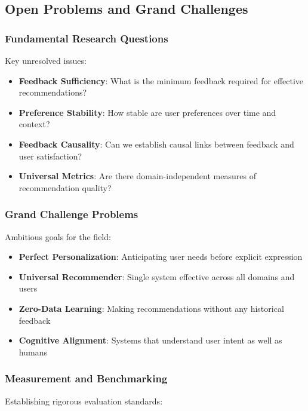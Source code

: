 \documentclass[acmsmall,review,anonymous]{acmart}
\begin{document}
\subsection{Open Problems and Grand Challenges}

\subsubsection{Fundamental Research Questions}

Key unresolved issues:

\begin{itemize}
    \item \textbf{Feedback Sufficiency}: What is the minimum feedback required for effective recommendations?
    \item \textbf{Preference Stability}: How stable are user preferences over time and context?
    \item \textbf{Feedback Causality}: Can we establish causal links between feedback and user satisfaction?
    \item \textbf{Universal Metrics}: Are there domain-independent measures of recommendation quality?
\end{itemize}

\subsubsection{Grand Challenge Problems}

Ambitious goals for the field:

\begin{itemize}
    \item \textbf{Perfect Personalization}: Anticipating user needs before explicit expression
    \item \textbf{Universal Recommender}: Single system effective across all domains and users
    \item \textbf{Zero-Data Learning}: Making recommendations without any historical feedback
    \item \textbf{Cognitive Alignment}: Systems that understand user intent as well as humans
\end{itemize}

\subsubsection{Measurement and Benchmarking}

Establishing rigorous evaluation standards:
\end{document}
